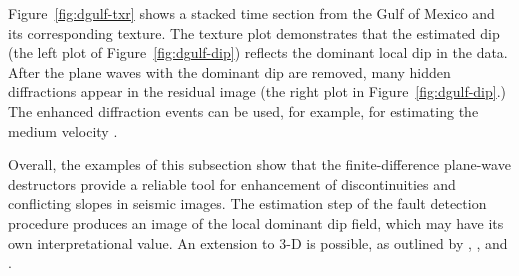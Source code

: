\par

Figure~\ref{fig:dgulf-txr} shows a stacked time section from the Gulf of
Mexico and its corresponding texture. The texture plot demonstrates
that the estimated dip (the left plot of Figure~\ref{fig:dgulf-dip})
reflects the dominant local dip in the data. After the plane waves
with the dominant dip are removed, many hidden diffractions appear in the
residual image (the right plot in Figure~\ref{fig:dgulf-dip}.) The
enhanced diffraction events can be used, for example, for 
estimating the medium velocity \cite[]{GEO49-11-18691880}.

\par
Overall, the examples of this subsection show that the
finite-difference plane-wave destructors provide a reliable tool for
enhancement of discontinuities and conflicting slopes in seismic
images. The estimation step of the fault detection procedure produces
an image of the local dominant dip field, which may have its own
interpretational value. An extension to 3-D is possible, as outlined
by \cite{Schwab.sepphd.99}, \cite{Clapp.sepphd.106}, and
\cite{Fomel.sepphd.107}.

